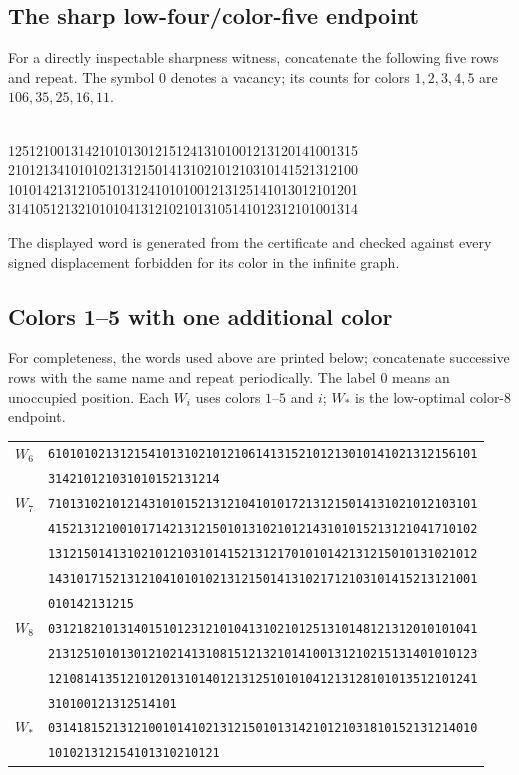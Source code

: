 \documentclass[11pt,reqno]{amsart}
\theoremstyle{plain}
\theoremstyle{plain}
\theoremstyle{plain}
\begin{document}
\subsection{The sharp low-four/color-five endpoint}
For a directly inspectable sharpness witness, concatenate the following five
rows and repeat. The symbol $0$ denotes a vacancy; its counts for colors
$1,2,3,4,5$ are $106,35,25,16,11$.
\begin{center}\footnotesize{}\\
12512100131421010130121512413101001213120141001315\\
21012134101010213121501413102101210310141521312100\\
10101421312105101312410101001213125141013012101201\\
31410512132101010413121021013105141012312101001314
\end{center}
The displayed word is generated from the certificate and checked against
every signed displacement forbidden for its color in the infinite graph.



\subsection{Colors 1--5 with one additional color}
For completeness, the words used above are printed below; concatenate
successive rows with the same name and repeat periodically. The label $0$
means an unoccupied position. Each $W_i$ uses colors $1$--$5$ and $i$;
$W_*$ is the low-optimal color-$8$ endpoint.
\begin{center}\small
\begin{tabular}{rl}
$W_{6}$ & \texttt{610101021312154101310210121061413152101213010141021312156101} \\
 & \texttt{314210121031010152131214} \\
$W_{7}$ & \texttt{710131021012143101015213121041010172131215014131021012103101} \\
 & \texttt{415213121001017142131215010131021012143101015213121041710102} \\
 & \texttt{131215014131021012103101415213121701010142131215010131021012} \\
 & \texttt{143101715213121041010102131215014131021712103101415213121001} \\
 & \texttt{010142131215} \\
$W_{8}$ & \texttt{031218210131401510123121010413102101251310148121312010101041} \\
 & \texttt{213125101013012102141310815121321014100131210215131401010123} \\
 & \texttt{121081413512101201310140121312510101041213128101013512101241} \\
 & \texttt{310100121312514101} \\
$W_{*}$ & \texttt{031418152131210010141021312150101314210121031810152131214010} \\
 & \texttt{101021312154101310210121} \\
\end{tabular}
\end{center}
\end{document}
